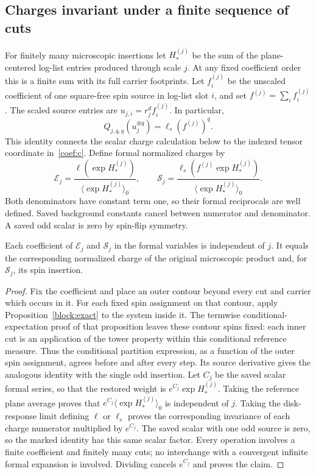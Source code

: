 \subsection{Charges invariant under a finite sequence of cuts}
For finitely many microscopic insertions let $H_*^{(j)}$ be the sum of the
plane-centered log-list entries produced through scale $j$.  At any fixed
coefficient order this is a finite sum with its full carrier footprints.
Let $f_i^{(j)}$ be the unscaled coefficient of one square-free spin source
in log-list slot $i$, and set $f^{(j)}=\sum_i f_i^{(j)}$.  The scaled
source entries are $u_{j,i}=r_j^d f_i^{(j)}$.  In particular,
\[
 Q_{j,q,y}(u_j^{\otimes q})=\ell_s(f^{(j)})^q.
\]
This identity connects the scalar charge calculation below to the indexed
tensor coordinate in~\eqref{coef:c}.  Define formal normalized charges by
\begin{equation}\label{coef:invariants}
 \mathcal E_j=\frac{\ell(\exp H_*^{(j)})}
                    {\langle\exp H_*^{(j)}\rangle_0},\qquad
 \mathcal S_j=\frac{\ell_s(f^{(j)}\exp H_*^{(j)})}
                    {\langle\exp H_*^{(j)}\rangle_0}.
\end{equation}
Both denominators have constant term one, so their formal reciprocals are
well defined.  Saved background constants cancel between numerator and
denominator.  A saved odd scalar is zero by spin-flip symmetry.

\begin{lemma}\label{coef:invariance}
Each coefficient of $\mathcal E_j$ and $\mathcal S_j$ in the formal variables
is independent of $j$.  It equals the corresponding normalized charge of
the original microscopic product and, for $\mathcal S_j$, its spin insertion.
\end{lemma}

\begin{proof}
Fix the coefficient and place an outer contour beyond every cut and carrier
which occurs in it.  For each fixed spin assignment on that contour, apply
Proposition~\ref{block:exact} to the system inside it.  The termwise
conditional-expectation proof of that proposition leaves these contour spins
fixed: each inner cut is an application of the tower property within this
conditional reference measure.  Thus the conditional partition expression,
as a function of the outer spin assignment, agrees before and after every
step.  Its source derivative gives the analogous identity with the single
odd insertion.  Let $C_j$ be the saved scalar formal series, so that the restored
weight is $e^{C_j}\exp H_*^{(j)}$.  Taking the reference plane average
proves that $e^{C_j}\langle\exp H_*^{(j)}\rangle_0$ is independent
of $j$.  Taking the disk-response limit defining $\ell$ or $\ell_s$
proves the corresponding invariance of each charge numerator multiplied
by $e^{C_j}$.  The saved scalar with one odd source is zero, so the marked
identity has this same scalar factor.  Every operation involves a finite
coefficient and finitely many cuts; no interchange with a convergent
infinite formal expansion is involved.  Dividing cancels $e^{C_j}$ and
proves the claim.
\end{proof}

